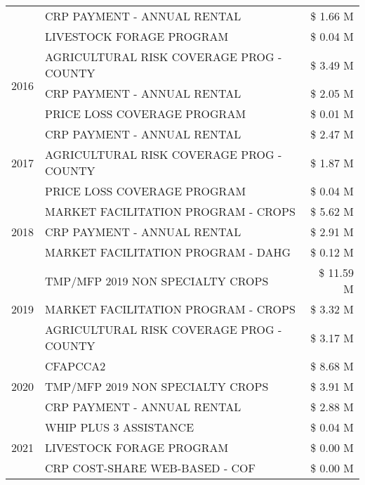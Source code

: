 \begin{tabular}{llr}
 & CRP PAYMENT - ANNUAL RENTAL & \$ 1.66 M \\
 & LIVESTOCK FORAGE PROGRAM & \$ 0.04 M \\
\cline{1-3}
\multirow[t]{3}{*}{2016} & AGRICULTURAL RISK COVERAGE PROG - COUNTY & \$ 3.49 M \\
 & CRP PAYMENT - ANNUAL RENTAL & \$ 2.05 M \\
 & PRICE LOSS COVERAGE PROGRAM & \$ 0.01 M \\
\cline{1-3}
\multirow[t]{3}{*}{2017} & CRP PAYMENT - ANNUAL RENTAL & \$ 2.47 M \\
 & AGRICULTURAL RISK COVERAGE PROG - COUNTY & \$ 1.87 M \\
 & PRICE LOSS COVERAGE PROGRAM & \$ 0.04 M \\
\cline{1-3}
\multirow[t]{3}{*}{2018} & MARKET FACILITATION PROGRAM - CROPS & \$ 5.62 M \\
 & CRP PAYMENT - ANNUAL RENTAL & \$ 2.91 M \\
 & MARKET FACILITATION PROGRAM - DAHG & \$ 0.12 M \\
\cline{1-3}
\multirow[t]{3}{*}{2019} & TMP/MFP 2019 NON SPECIALTY CROPS & \$ 11.59 M \\
 & MARKET FACILITATION PROGRAM - CROPS & \$ 3.32 M \\
 & AGRICULTURAL RISK COVERAGE PROG - COUNTY & \$ 3.17 M \\
\cline{1-3}
\multirow[t]{3}{*}{2020} & CFAPCCA2 & \$ 8.68 M \\
 & TMP/MFP 2019 NON SPECIALTY CROPS & \$ 3.91 M \\
 & CRP PAYMENT - ANNUAL RENTAL & \$ 2.88 M \\
\cline{1-3}
\multirow[t]{3}{*}{2021} & WHIP PLUS 3 ASSISTANCE & \$ 0.04 M \\
 & LIVESTOCK FORAGE PROGRAM & \$ 0.00 M \\
 & CRP COST-SHARE WEB-BASED - COF & \$ 0.00 M \\
\cline{1-3}
\bottomrule
\end{tabular}
